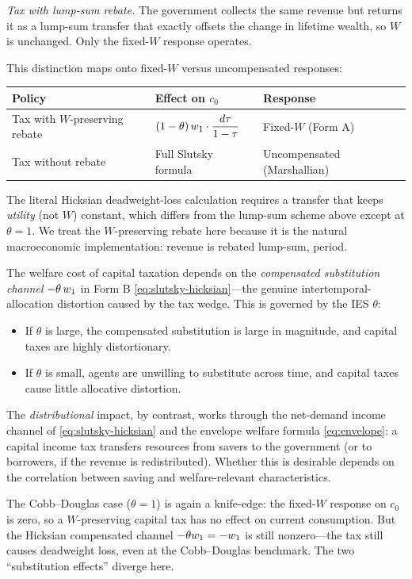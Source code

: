 \medskip
\noindent
\textit{Tax with lump-sum rebate.} The government collects the same revenue but returns it as a lump-sum transfer that exactly offsets the change in lifetime wealth, so $W$ is unchanged. Only the fixed-$W$ response operates.

\medskip
This distinction maps onto fixed-$W$ versus uncompensated responses:

\begin{center}
\renewcommand{\arraystretch}{1.4}
\begin{tabular}{@{}lll@{}}
\toprule
\textbf{Policy} & \textbf{Effect on $c_0$} & \textbf{Response} \\
\midrule
Tax with $W$-preserving rebate & $(1-\theta) \, w_1 \cdot \dfrac{d\tau}{1-\tau}$ & Fixed-$W$ (Form A) \\[8pt]
Tax without rebate & Full Slutsky formula & Uncompensated (Marshallian) \\
\bottomrule
\end{tabular}
\end{center}
The literal Hicksian deadweight-loss calculation requires a transfer that keeps \emph{utility} (not $W$) constant, which differs from the lump-sum scheme above except at $\theta = 1$. We treat the $W$-preserving rebate here because it is the natural macroeconomic implementation: revenue is rebated lump-sum, period.

\begin{calloutimportant}
The welfare cost of capital taxation depends on the \emph{compensated substitution channel} $-\theta\,w_1$ in Form B \cref{eq:slutsky-hicksian}---the genuine intertemporal-allocation distortion caused by the tax wedge. This is governed by the IES $\theta$:
\begin{itemize}[nosep]
\item If $\theta$ is large, the compensated substitution is large in magnitude, and capital taxes are highly distortionary.
\item If $\theta$ is small, agents are unwilling to substitute across time, and capital taxes cause little allocative distortion.
\end{itemize}
The \emph{distributional} impact, by contrast, works through the net-demand income channel of \cref{eq:slutsky-hicksian} and the envelope welfare formula \cref{eq:envelope}: a capital income tax transfers resources from savers to the government (or to borrowers, if the revenue is redistributed). Whether this is desirable depends on the correlation between saving and welfare-relevant characteristics.

The Cobb--Douglas case ($\theta = 1$) is again a knife-edge: the fixed-$W$ response on $c_0$ is zero, so a $W$-preserving capital tax has no effect on current consumption. But the Hicksian compensated channel $-\theta w_1 = -w_1$ is still nonzero---the tax still causes deadweight loss, even at the Cobb--Douglas benchmark. The two ``substitution effects'' diverge here.
\end{calloutimportant}


